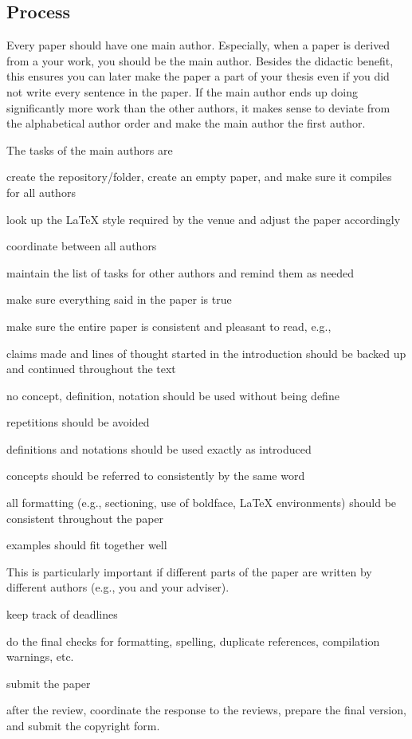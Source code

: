 \documentclass[12pt]{article}
\begin{document}
\subsection{Process}

Every paper should have one main author.
Especially, when a paper is derived from a your work, you should be the main author.
Besides the didactic benefit, this ensures you can later make the paper a part of your thesis even if you did not write every sentence in the paper.
If the main author ends up doing significantly more work than the other authors, it makes sense to deviate from the alphabetical author order and make the main author the first author.

The tasks of the main authors are
\begin{compactitem}
\item create the repository/folder, create an empty paper, and make sure it compiles for all authors
\item look up the LaTeX style required by the venue and adjust the paper accordingly
\item coordinate between all authors
\item maintain the list of tasks for other authors and remind them as needed
\item make sure everything said in the paper is true
\item make sure the entire paper is consistent and pleasant to read, e.g.,
 \begin{compactitem}
  \item claims made and lines of thought started in the introduction should be backed up and continued throughout the text
  \item no concept, definition, notation should be used without being define
  \item repetitions should be avoided
  \item definitions and notations should be used exactly as introduced
  \item concepts should be referred to consistently by the same word
  \item all formatting (e.g., sectioning, use of boldface, LaTeX environments) should be consistent throughout the paper
  \item examples should fit together well
 \end{compactitem}
 This is particularly important if different parts of the paper are written by different authors (e.g., you and your adviser).
\item keep track of deadlines
\item do the final checks for formatting, spelling, duplicate references, compilation warnings, etc.
\item submit the paper
\item after the review, coordinate the response to the reviews, prepare the final version, and submit the copyright form.
\end{compactitem}
\end{document}
